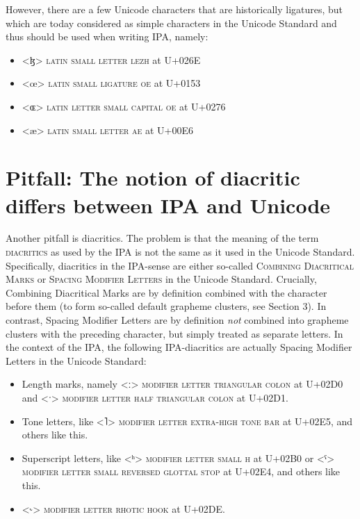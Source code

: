 However, there are a few Unicode characters that are historically ligatures, but
which are today considered as simple characters in the Unicode Standard and thus
should be used when writing IPA, namely:

\begin{itemize}
	\item <ɮ> \textsc{latin small letter lezh} at U+026E \item <œ>
	\textsc{latin small ligature oe} at U+0153 \item <ɶ> \textsc{latin
	letter small capital oe} at U+0276 \item <æ> \textsc{latin small letter
	ae} at U+00E6
\end{itemize}

\section{Pitfall: The notion of diacritic differs between IPA and Unicode}
\label{pitfall-the-ipa-notion-of-diacritics-is-not-the-same-as-the-unicode-standards-notion-of-diacritics}

Another pitfall is diacritics. The problem is that the meaning of the term
\textsc{diacritics} as used by the IPA is not the same as it used in the Unicode
Standard. Specifically, diacritics in the IPA-sense are either so-called
\textsc{Combining Diacritical Marks} or \textsc{Spacing Modifier Letters} in the
Unicode Standard. Crucially, Combining Diacritical Marks are by definition
combined with the character before them (to form so-called default grapheme
clusters, see Section 3). In contrast, Spacing Modifier Letters are by
definition \emph{not} combined into grapheme clusters with the preceding
character, but simply treated as separate letters. In the context of the IPA,
the following IPA-diacritics are actually Spacing Modifier Letters in the
Unicode Standard:

\begin{itemize}
	\item Length marks, namely <ː> \textsc{modifier letter triangular colon}
	at U+02D0 and <ˑ> \textsc{modifier letter half triangular colon} at
	U+02D1.  \item Tone letters, like <˥> \textsc{modifier letter extra-high
	tone bar} at U+02E5, and others like this.  \item Superscript letters,
	like <ʰ> \textsc{modifier letter small h} at U+02B0 or <ˤ>
	\textsc{modifier letter small reversed glottal stop} at U+02E4, and
	others like this.  \item <˞> \textsc{modifier letter rhotic hook} at
	U+02DE.
\end{itemize}

